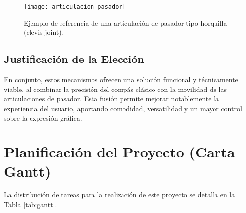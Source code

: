 \documentclass[11pt, a4paper]{article}
\begin{document}
\begin{figure}[htbp]
    \centering
    \texttt{[image: articulacion\_pasador]}
    \caption{Ejemplo de referencia de una articulación de pasador tipo horquilla (clevis joint).}
    \label{fig:ref_articulacion}
\end{figure}

\subsection{Justificación de la Elección}
En conjunto, estos mecanismos ofrecen una solución funcional y técnicamente viable, al combinar la precisión del compás clásico con la movilidad de las articulaciones de pasador. Esta fusión permite mejorar notablemente la experiencia del usuario, aportando comodidad, versatilidad y un mayor control sobre la expresión gráfica.





\section{Planificación del Proyecto (Carta Gantt)}
La distribución de tareas para la realización de este proyecto se detalla en la Tabla \ref{tab:gantt}.
\end{document}
